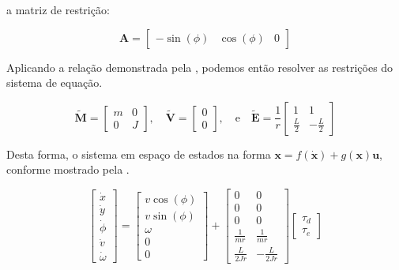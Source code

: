 \noindent a matriz de restrição:

\begin{equation*}
    \mathbf{A} = 
    \begin{bmatrix}
        -\sin(\phi) & \cos(\phi) & 0
    \end{bmatrix}
\end{equation*}

Aplicando a relação demonstrada pela , podemos então resolver as restrições do sistema de equação.

\begin{equation*}
    \mathbf{\tilde{M}} = 
    \begin{bmatrix}
        m & 0 \\
        0 & J
    \end{bmatrix}, \quad
    \mathbf{\tilde{V}} = 
    \begin{bmatrix}
        0 \\ 0
    \end{bmatrix}, \quad \text{e} \quad
    \mathbf{\tilde{E}} = \frac{1}{r}
    \begin{bmatrix}
        1 & 1\\
        \displaystyle\frac{L}{2} & - \displaystyle\frac{L}{2}
    \end{bmatrix}
\end{equation*}

Desta forma, o sistema em espaço de estados na forma $\mathbf{x} = f(\mathbf{\dot{x}}) + g(\mathbf{x})\mathbf{u}$, conforme mostrado pela .

\begin{equation}
    \begin{bmatrix}
        \dot{x} \\ \dot{y} \\ \dot{\phi} \\ \dot{v} \\ \dot{\omega}
    \end{bmatrix} = 
    \begin{bmatrix}
        v\cos(\phi) \\ v\sin(\phi) \\ \omega \\ 0 \\ 0
    \end{bmatrix} + 
    \begin{bmatrix}
        0 & 0 \\
        0 & 0 \\
        0 & 0 \\
        \frac{1}{mr} & \frac{1}{mr} \\
        \frac{L}{2Jr} & -\frac{L}{2Jr}
    \end{bmatrix}
    \begin{bmatrix}
        \tau_d \\ \tau_e
    \end{bmatrix}
    \label{eq:fullmodel}
\end{equation}

